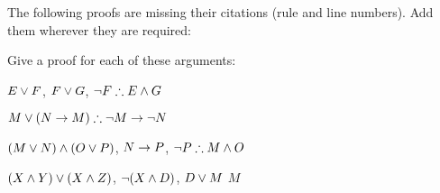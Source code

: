 \begin{practiceproblems}
\solutions
\problempart
\label{pr.justifyTFLproof}
The following proofs are missing their citations (rule and line numbers). Add them wherever they are required:
\begin{multicols}{2}
\begin{pf}
 {}
 {}
\end{pf}
%
\vfill
%
\begin{pf}
\open
\close
{}
\end{pf}
%
\columnbreak
%
\begin{pf}
\open
\close
{}
\open
\close
{}
\end{pf}
\end{multicols}

\problempart
Give a proof for each of these arguments:
\begin{earg}
\item $E\vee F$, $F\vee G$, $\enot F \therefore E \eand G$
\item $M\eor(N\eif M) \therefore \enot M \eif \enot N$
\item $(M \vee N) \mathbin{\wedge} (O \vee P)$, $N \rightarrow P$, $\enot P \therefore M\eand O$
\item $(X\mathbin{\wedge} Y)\vee(X\mathbin{\wedge} Z)$, $\neg(X\mathbin{\wedge} D)$, $D\vee M$ \therefore $M$
\end{earg}



\end{practiceproblems}

